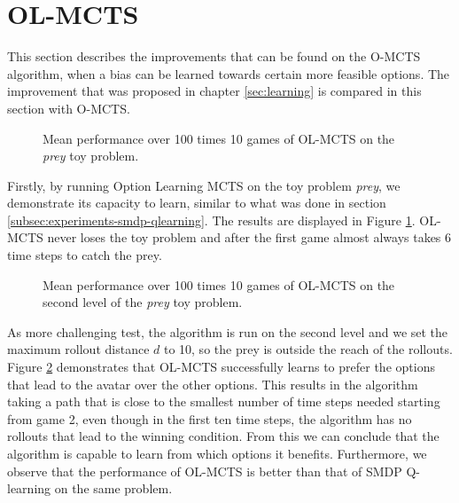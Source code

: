 \section{OL-MCTS}
\label{subsec:olmcts}

This section describes the improvements that can be found on the O-MCTS
algorithm, when a bias can be learned towards certain more feasible options. The
improvement that was proposed in chapter \ref{sec:learning} is compared in this
section with O-MCTS.

\begin{figure}
	\centering
	\caption{Mean performance over 100 times 10 games of OL-MCTS on the
	\textit{prey} toy problem.}
	\label{fig:olmctsPrey}
\end{figure}

Firstly, by running Option Learning MCTS on the toy problem \textit{prey}, we
demonstrate its capacity to learn, similar to what was done in section
\ref{subsec:experiments-smdp-qlearning}. The results are displayed in Figure
\ref{fig:olmctsPrey}. OL-MCTS never loses the toy problem and after the first
game almost always takes 6 time steps to catch the prey. 

\begin{figure}
	\centering
	\caption{Mean performance over 100 times 10 games of OL-MCTS on the second
		level of the \textit{prey} toy problem.}
	\label{fig:olmctsPrey3}
\end{figure}

As more challenging test, the algorithm is run on the second level and we set
the maximum rollout distance $d$ to 10, so the prey is outside the reach of the
rollouts. Figure \ref{fig:olmctsPrey3} demonstrates that OL-MCTS successfully
learns to prefer the options that lead to the avatar over the other options.
This results in the algorithm taking a path that is close to the smallest number
of time steps needed starting from game 2, even though in the first ten time
steps, the algorithm has no rollouts that lead to the winning condition. From
this we can conclude that the algorithm is capable to learn from which options
it benefits. Furthermore, we observe that the performance of OL-MCTS is better
than that of SMDP Q-learning on the same problem.


